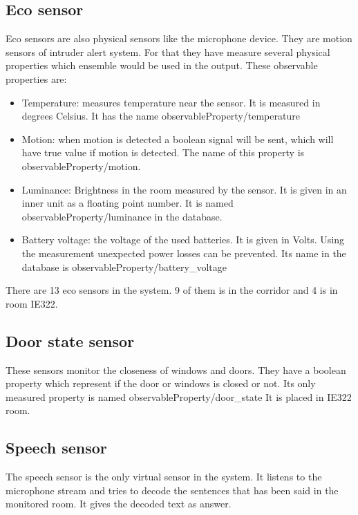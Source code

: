  \subsection*{Eco sensor}
 Eco sensors are also physical sensors like the microphone device. They are motion sensors of intruder alert system. For that they have measure several physical properties which ensemble would be used in the output. These observable properties are:
 \begin{itemize}
 \item Temperature: measures temperature near the sensor. It is measured in degrees Celsius. It has the name observableProperty/temperature
 \item Motion: when motion is detected a boolean signal will be sent, which will have true value if motion is detected. The name of this property is observableProperty/motion.
 \item Luminance: Brightness in the room measured by the sensor. It is given in an inner unit as a floating point number. It is named observableProperty/luminance in the database.
 \item Battery voltage: the voltage of the used batteries. It is given in Volts. Using the measurement unexpected power losses can be prevented. Its name in the database is observableProperty/battery\_voltage
 \end{itemize}
 There are 13 eco sensors in the system. 9 of them is in the corridor and 4 is in room IE322.  
 
 \subsection*{Door state sensor}
 These sensors monitor the closeness of windows and doors. They have a boolean property which represent if the door or windows is closed or not. Its only measured property is named observableProperty/door\_state
 It is placed in IE322 room.
 
\subsection*{Speech sensor}

The speech sensor is the only virtual sensor in the system. It listens to the microphone stream and tries to decode the sentences that has been said in the monitored room. It gives the decoded text as answer.


